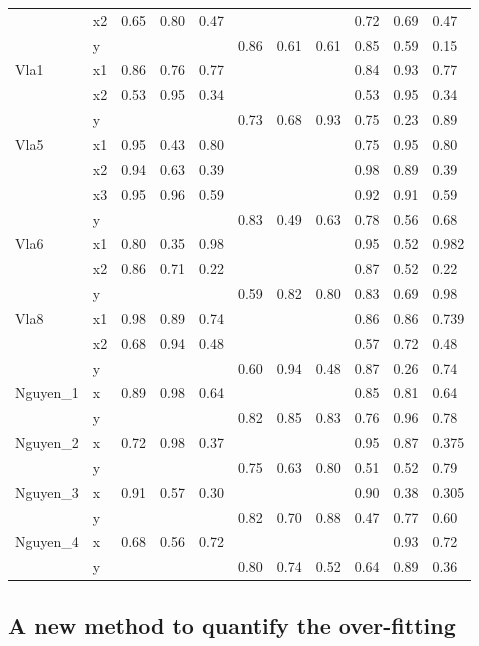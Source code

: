 \begin{table}
\begin{tabular}{lllllllllll}
& x2 & 0.65 & 0.80 & 0.47 & & & & 0.72 & 0.69 & 0.47 \\
& y & & & & 0.86 & 0.61 & 0.61 & 0.85 & 0.59 & 0.15 \\
Vla1 & x1 & 0.86 & 0.76 & 0.77 & & & & 0.84 & 0.93 & 0.77 \\
& x2 & 0.53 & 0.95 & 0.34 & & & & 0.53 & 0.95 & 0.34 \\
& y & & & & 0.73 & 0.68 & 0.93 & 0.75 & 0.23 & 0.89 \\
Vla5 & x1 & 0.95 & 0.43 & 0.80 & & & & 0.75 & 0.95 & 0.80 \\
& x2 & 0.94 & 0.63 & 0.39 & & & & 0.98 & 0.89 & 0.39 \\
& x3 & 0.95 & 0.96 & 0.59 & & & & 0.92 & 0.91 & 0.59 \\
& y & & & & 0.83 & 0.49 & 0.63 & 0.78 & 0.56 & 0.68 \\
Vla6 & x1 & 0.80 & 0.35 & 0.98 & & & & 0.95 & 0.52 & 0.982 \\
& x2 & 0.86 & 0.71 & 0.22 & & & & 0.87 & 0.52 & 0.22 \\
& y & & & & 0.59 & 0.82 & 0.80 & 0.83 & 0.69 & 0.98 \\
Vla8 & x1 & 0.98 & 0.89 & 0.74 & & & & 0.86 & 0.86 & 0.739 \\
& x2 & 0.68 & 0.94 & 0.48 &  & & & 0.57 & 0.72 & 0.48 \\
& y & & & & 0.60 & 0.94 & 0.48 & 0.87 & 0.26 & 0.74 \\
Nguyen\_1 & x & 0.89 & 0.98 & 0.64 & & & & 0.85 & 0.81 & 0.64 \\
& y & & &  & 0.82 & 0.85 & 0.83 & 0.76 & 0.96 & 0.78 \\
Nguyen\_2 & x & 0.72 & 0.98 & 0.37 & & & & 0.95 & 0.87 & 0.375 \\
& y & & & & 0.75 & 0.63 & 0.80 & 0.51 & 0.52 & 0.79 \\
Nguyen\_3 & x & 0.91 & 0.57 & 0.30 & & & & 0.90 & 0.38 & 0.305 \\
& y & &  & & 0.82 & 0.70 & 0.88 & 0.47 & 0.77 & 0.60 \\
Nguyen\_4 & x & 0.68 & 0.56 & 0.72 & & & & & 0.93 & 0.72 \\
& y & & & & 0.80 & 0.74 & 0.52 & 0.64 & 0.89 & 0.36 \\
\hline
\end{tabular}
\end{table}
\subsection{A new method to quantify the over-fitting}
\label{Ane}
